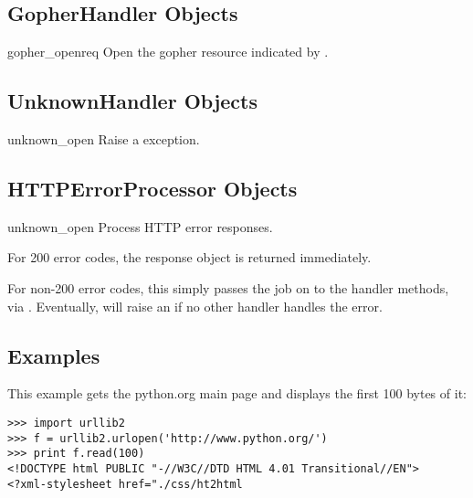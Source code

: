 \subsection{GopherHandler Objects \label{gopher-handler}}

\begin{methoddesc}[GopherHandler]{gopher_open}{req}
Open the gopher resource indicated by .
\end{methoddesc}


\subsection{UnknownHandler Objects \label{unknown-handler-objects}}

\begin{methoddesc}[UnknownHandler]{unknown_open}{}
Raise a  exception.
\end{methoddesc}


\subsection{HTTPErrorProcessor Objects \label{http-error-processor-objects}}


\begin{methoddesc}[HTTPErrorProcessor]{unknown_open}{}
Process HTTP error responses.

For 200 error codes, the response object is returned immediately.

For non-200 error codes, this simply passes the job on to the
 handler methods, via
.  Eventually,
 will raise an
 if no other handler handles the error.
\end{methoddesc}


\subsection{Examples \label{urllib2-examples}}

This example gets the python.org main page and displays the first 100
bytes of it:

\begin{verbatim}
>>> import urllib2
>>> f = urllib2.urlopen('http://www.python.org/')
>>> print f.read(100)
<!DOCTYPE html PUBLIC "-//W3C//DTD HTML 4.01 Transitional//EN">
<?xml-stylesheet href="./css/ht2html
\end{verbatim}

